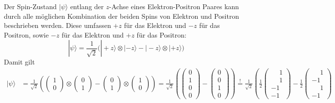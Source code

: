 \begin{refsection}
Der Spin-Zustand $|\psi\rangle$ entlang der $z$-Achse eines 
Elektron-Positron Paares  kann durch alle m\"oglichen Kombination der beiden
Spins von Elektron und Positron beschrieben werden. 
Diese umfassen $+z$ f\"ur das Elektron und $-z$
f\"ur das Positron, sowie $-z$ f\"ur das Elektron und $+z$ f\"ur das Positron:
\begin{equation}
    |\psi\rangle = \frac{1}{\sqrt{2}} \Big( 
        |{+}z\rangle \otimes |{-}z\rangle - |{-}z\rangle \otimes |{+}z\rangle
     \Big)
     \label{equ:bell:spinstate}
\end{equation}
Damit gilt
\begin{align}
    |\psi\rangle &= \frac{1}{\sqrt{2}} 
    \left( 
        \begin{pmatrix} 1\\0 \end{pmatrix} 
        \otimes 
        \begin{pmatrix} 0\\1 \end{pmatrix}
        -
        \begin{pmatrix} 0\\1 \end{pmatrix}
        \otimes
        \begin{pmatrix} 1\\0 \end{pmatrix}
     \right)
     =
     \frac{1}{\sqrt{2}}\left(
         \begin{pmatrix} 0 \\ 1 \\ 0 \\ 0 \end{pmatrix}
         -
         \begin{pmatrix} 0 \\ 0 \\ 1 \\ 0 \end{pmatrix}
     \right)
     \stackrel{!}{=}
     \frac{1}{\sqrt{2}}\left(
         \frac{1}{2}
         \begin{pmatrix} \phantom{-}1 \\ \phantom{-}1 \\ -1 \\ -1 \end{pmatrix}
         -
         \frac{1}{2}
         \begin{pmatrix} \phantom{-}1 \\ -1 \\ \phantom{-}1 \\ -1 \end{pmatrix}

\end{align}
\end{refsection}
